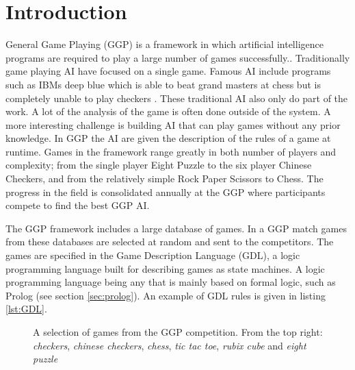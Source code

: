 \chapter{Introduction}\label{ch:intro}
General Game Playing (GGP) is a framework in which artificial intelligence programs are required to play a large number of games successfully.\cite{Genesereth/GGPOverview}. Traditionally game playing AI have focused on a single game\cite{AlphaGo,DeepBlue,Schaeffer/Checkers,Tesauro/Backgammon}. Famous AI include programs such as IBMs deep blue which is able to beat grand masters at chess but is completely unable to play checkers \cite{DeepBlue}. These traditional AI also only do part of the work. A lot of the analysis of the game is often done outside of the system\cite{Schaeffer/Checkers}. A more interesting challenge is building AI that can play games without any prior knowledge. In GGP the AI are given the description of the rules of a game at runtime. Games in the framework range greatly in both number of players and complexity; from the single player Eight Puzzle to the six player Chinese Checkers, and from the relatively simple Rock Paper Scissors to Chess\cite{GGP-Website}. The progress in the field is consolidated annually at the GGP where participants compete to find the best GGP AI\cite{Genesereth/GGPOverview}.

The GGP framework includes a large database of games. In a GGP match games from these databases are selected at random and sent to the competitors\cite{Genesereth/GGPOverview}. The games are specified in the Game Description Language (GDL), a logic programming language built for describing games as state machines\cite{GDL_Spec}. A logic programming language being any that is mainly based on formal logic, such as Prolog (see section \ref{sec:prolog}). An example of GDL rules is given in listing \ref{lst:GDL}.


\begin{figure}[ht]
	\centering
	\caption{A selection of games from the GGP competition. From the top right: \textit{checkers}, \textit{chinese checkers}, \textit{chess}, \textit{tic tac toe}, \textit{rubix cube} and \textit{eight puzzle}}
\end{figure}




